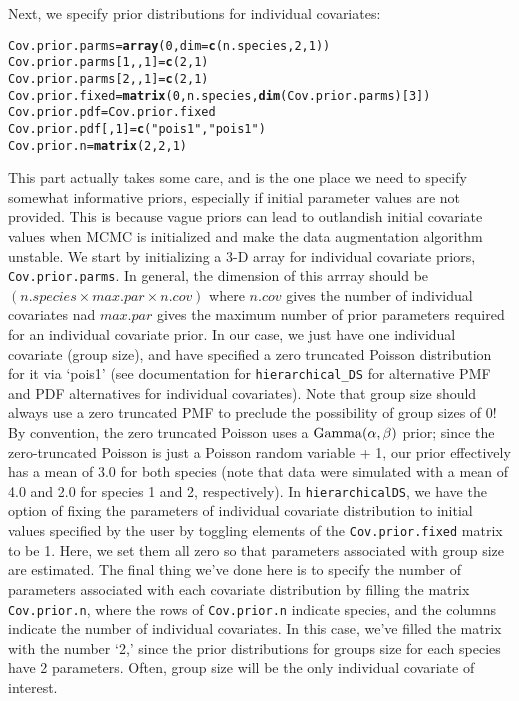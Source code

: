 \documentclass{article}\usepackage{graphicx, color}
\makeatletter
\newcommand{\hlfunctioncall}[1]{\textcolor[rgb]{0.501960784313725,0,0.329411764705882}{\textbf{#1}}}%
\newcommand{\hlstring}[1]{\textcolor[rgb]{0.6,0.6,1}{#1}}%
\newenvironment{kframe}{%
 \def\at@end@of@kframe{}%
 \ifinner\ifhmode%
  \def\at@end@of@kframe{\end{minipage}}%
  \begin{minipage}{\columnwidth}%
 \fi\fi%
 \def\FrameCommand##1{\hskip\@totalleftmargin \hskip-\fboxsep
 \colorbox{shadecolor}{##1}\hskip-\fboxsep
     \hskip-\linewidth \hskip-\@totalleftmargin \hskip\columnwidth}%
 \MakeFramed {\advance\hsize-\width
   \@totalleftmargin\z@ \linewidth\hsize
   \@setminipage}}%
 {\par\unskip\endMakeFramed%
 \at@end@of@kframe}
\newenvironment{knitrout}{}{} %
\makeatother
\begin{document}
Next, we specify prior distributions for individual covariates:

\begin{knitrout}
\color{fgcolor}\begin{kframe}
\begin{alltt}
Cov.prior.parms = \hlfunctioncall{array}(0, dim = \hlfunctioncall{c}(n.species, 2, 1))
Cov.prior.parms[1, , 1] = \hlfunctioncall{c}(2, 1)
Cov.prior.parms[2, , 1] = \hlfunctioncall{c}(2, 1)
Cov.prior.fixed = \hlfunctioncall{matrix}(0, n.species, \hlfunctioncall{dim}(Cov.prior.parms)[3])
Cov.prior.pdf = Cov.prior.fixed
Cov.prior.pdf[, 1] = \hlfunctioncall{c}(\hlstring{"pois1"}, \hlstring{"pois1"})
Cov.prior.n = \hlfunctioncall{matrix}(2, 2, 1)
\end{alltt}
\end{kframe}
\end{knitrout}

This part actually takes some care, and is the one place we need to specify somewhat informative priors, especially if initial parameter values are not provided.  This is because vague priors can lead to outlandish initial covariate values when MCMC is initialized and make the data augmentation algorithm unstable.  We start by initializing a 3-D
array for individual covariate priors, \texttt{Cov.prior.parms}.  In general, the dimension of this arrray should be $(n.species \times max.par \times n.cov)$ where $n.cov$ gives the number of individual covariates nad $max.par$ gives the maximum number of prior parameters required for an individual covariate prior.  In our case, we just have one individual covariate (group size), and have specified a zero truncated Poisson distribution for it via `pois1' (see documentation for \texttt{hierarchical\_DS} for alternative PMF and PDF alternatives for individual covariates).  Note that group size should always use a zero truncated PMF to preclude the possibility of group sizes of 0!
By convention, the zero truncated Poisson uses a ${\rm Gamma}(\alpha,\beta)$ prior; since the zero-truncated Poisson is just a Poisson random variable + 1, our prior effectively has a mean of 3.0 for both species (note that data were simulated with a mean of 4.0 and 2.0 for species 1 and 2, respectively).  In \texttt{hierarchicalDS}, we have the option of fixing the parameters of individual covariate distribution to 
initial values specified by the user by toggling elements of the \texttt{Cov.prior.fixed} matrix to be 1.  Here, we set them all zero so that parameters associated with group size are estimated.  The final thing we've done here is to specify the number of parameters associated with each covariate distribution by filling the matrix \texttt{Cov.prior.n}, where the rows of \texttt{Cov.prior.n} indicate species, and the columns indicate the number of individual covariates.  In this case, we've filled the matrix with the number `2,' since the prior distributions for groups size for each species have 2 parameters.  Often, group size will be the only individual covariate of interest.
\end{document}
